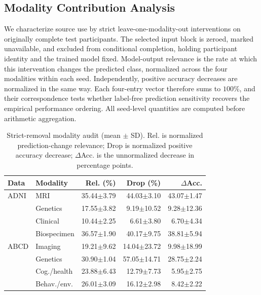 \documentclass[a4paper,fleqn]{cas-dc}
\begin{document}
\subsection{Modality Contribution Analysis}
\label{sec:decision_analysis}

We characterize source use by strict leave-one-modality-out interventions on originally complete test participants. The selected input block is zeroed, marked unavailable, and excluded from conditional completion, holding participant identity and the trained model fixed. Model-output relevance is the rate at which this intervention changes the predicted class, normalized across the four modalities within each seed. Independently, positive accuracy decreases are normalized in the same way. Each four-entry vector therefore sums to \(100\%\), and their correspondence tests whether label-free prediction sensitivity recovers the empirical performance ordering. All seed-level quantities are computed before arithmetic aggregation.

\begin{table}[t]
\centering
\caption{Strict-removal modality audit (mean $\pm$ SD). Rel. is normalized prediction-change relevance; Drop is normalized positive accuracy decrease; $\Delta$Acc. is the unnormalized decrease in percentage points.}
\label{tab:modality_contribution}
\setlength{\tabcolsep}{2.2pt}
\renewcommand{\arraystretch}{1.07}
\scriptsize
\begin{tabular*}{\columnwidth}{@{\extracolsep{\fill}}llrrr@{}}
\toprule
\textbf{Data} & \textbf{Modality} & \textbf{Rel. (\%)} & \textbf{Drop (\%)} & \textbf{$\Delta$Acc.} \\
\midrule
ADNI & MRI & 35.44$\pm$3.79 & 44.03$\pm$3.10 & 43.07$\pm$1.47 \\
 & Genetics & 17.55$\pm$3.82 & 9.19$\pm$10.52 & 9.28$\pm$12.36 \\
 & Clinical & 10.44$\pm$2.25 & 6.61$\pm$3.80 & 6.70$\pm$4.34 \\
 & Biospecimen & 36.57$\pm$1.90 & 40.17$\pm$9.75 & 38.81$\pm$5.94 \\
\midrule
ABCD & Imaging & 19.21$\pm$9.62 & 14.04$\pm$23.72 & 9.98$\pm$18.99 \\
 & Genetics & 30.90$\pm$1.04 & 57.05$\pm$14.71 & 28.75$\pm$2.24 \\
 & Cog./health & 23.88$\pm$6.43 & 12.79$\pm$7.73 & 5.95$\pm$2.75 \\
 & Behav./env. & 26.01$\pm$3.09 & 16.12$\pm$2.98 & 8.42$\pm$2.22 \\
\bottomrule
\end{tabular*}
\end{table}
\end{document}
